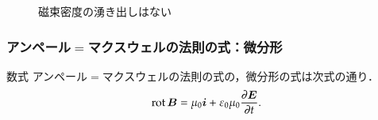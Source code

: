                 \begin{figure}[hbt]
                    \begin{center}
                        \caption{磁束密度の湧き出しはない}
                        \label{fig:GaussLowBImage_02}
                    \end{center}
                \end{figure}


            \subsubsection{アンペール$=$マクスウェルの法則の式：微分形}
            \begin{mysmallsec}{数式}
                アンペール$=$マクスウェルの法則の式の，微分形の式は次式の通り．
                \begin{align}
                    \mathrm{rot}\, \boldsymbol{B} = \mu_{0}\boldsymbol{i} + \varepsilon_{0}\mu_{0}\frac{\partial \boldsymbol{E}}{\partial t}.
                \end{align}
            \end{mysmallsec}

